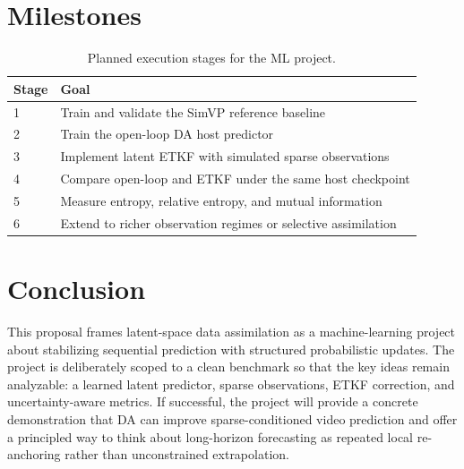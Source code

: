 \documentclass{article}
\begin{document}
\section{Milestones}

\begin{table}[t]
    \centering
    \caption{Planned execution stages for the ML project.}
    \label{tab:milestones}
    \begin{tabular}{ll}
        \toprule
        Stage & Goal \\
        \midrule
        1 & Train and validate the SimVP reference baseline \\
        2 & Train the open-loop DA host predictor \\
        3 & Implement latent ETKF with simulated sparse observations \\
        4 & Compare open-loop and ETKF under the same host checkpoint \\
        5 & Measure entropy, relative entropy, and mutual information \\
        6 & Extend to richer observation regimes or selective assimilation \\
        \bottomrule
    \end{tabular}
\end{table}

\section{Conclusion}

This proposal frames latent-space data assimilation as a machine-learning project about stabilizing sequential prediction with structured probabilistic updates. The project is deliberately scoped to a clean benchmark so that the key ideas remain analyzable: a learned latent predictor, sparse observations, ETKF correction, and uncertainty-aware metrics. If successful, the project will provide a concrete demonstration that DA can improve sparse-conditioned video prediction and offer a principled way to think about long-horizon forecasting as repeated local re-anchoring rather than unconstrained extrapolation.



\end{document}
